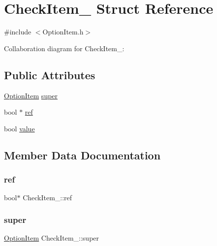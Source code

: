 \hypertarget{structCheckItem__}{}\section{Check\+Item\+\_\+ Struct Reference}
\label{structCheckItem__}


{\ttfamily \#include $<$Option\+Item.\+h$>$}



Collaboration diagram for Check\+Item\+\_\+\+:
\subsection*{Public Attributes}
\begin{DoxyCompactItemize}
\item 
\hyperlink{OptionItem_8h_ae801b448d89e9564273432c06d91b784}{Option\+Item} \hyperlink{structCheckItem___a8cf211f568ca0ed035ff78bda043f0e5}{super}
\item 
bool $\ast$ \hyperlink{structCheckItem___a184f15808e207efd6c6fd41081665f19}{ref}
\item 
bool \hyperlink{structCheckItem___ab0316f626cd4fab59ba1f1abfd5406cf}{value}
\end{DoxyCompactItemize}


\subsection{Member Data Documentation}
\mbox{\label{structCheckItem___a184f15808e207efd6c6fd41081665f19}} 
\subsubsection{\texorpdfstring{ref}{ref}}
{\footnotesize\ttfamily bool$\ast$ Check\+Item\+\_\+\+::ref}

\mbox{\label{structCheckItem___a8cf211f568ca0ed035ff78bda043f0e5}} 
\subsubsection{\texorpdfstring{super}{super}}
{\footnotesize\ttfamily \hyperlink{OptionItem_8h_ae801b448d89e9564273432c06d91b784}{Option\+Item} Check\+Item\+\_\+\+::super}

